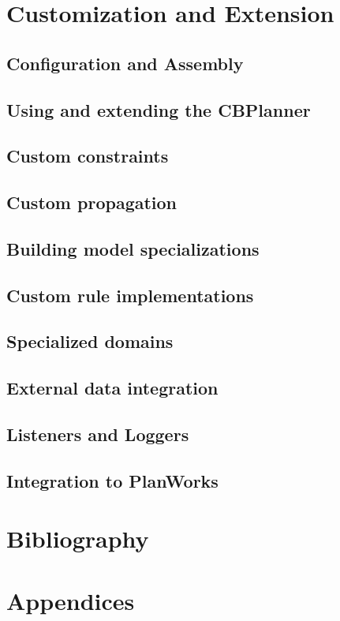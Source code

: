 \documentclass[10pt, letterpaper, twoside]{article}
\begin{document}
\section{Customization and Extension}
\subsection{Configuration and Assembly}
\subsection{Using and extending the CBPlanner}
\subsection{Custom constraints}
\subsection{Custom propagation}
\subsection{Building model specializations}
\subsection{Custom rule implementations}
\subsection{Specialized domains}
\subsection{External data integration}
\subsection{Listeners and Loggers}
\subsection{Integration to PlanWorks}

\section{Bibliography}

\section{Appendices}
\end{document}
